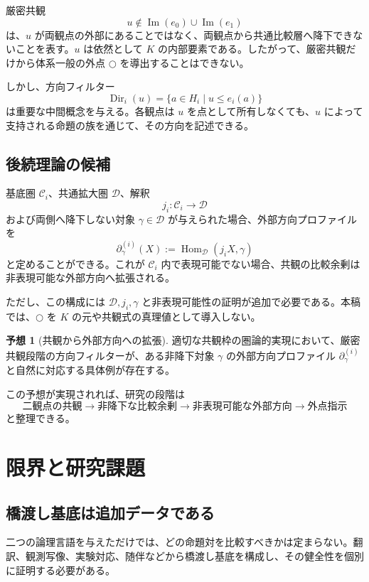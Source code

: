 \documentclass[a4paper,11pt]{ltjsarticle}
\theoremstyle{definition}
\newtheorem{conjecture}[definition]{予想}
\theoremstyle{plain}
\newcommand{\Img}{\operatorname{Im}}
\newcommand{\Dir}{\operatorname{Dir}}
\newcommand{\Hom}{\operatorname{Hom}}
\newcommand{\dfix}{\bigcirc}
\begin{document}
厳密共観
\[
 u\notin\Img(e_0)\cup\Img(e_1)
\]
は、$u$ が両観点の外部にあることではなく、両観点から共通比較層へ降下できないことを表す。$u$ は依然として $K$ の内部要素である。したがって、厳密共観だけから体系一般の外点 $\dfix$ を導出することはできない。

しかし、方向フィルター
\[
 \Dir_i(u)=\{a\in H_i\mid u\leq e_i(a)\}
\]
は重要な中間概念を与える。各観点は $u$ を点として所有しなくても、$u$ によって支持される命題の族を通じて、その方向を記述できる。

\subsection{後続理論の候補}

基底圏 $\mathcal C_i$、共通拡大圏 $\mathcal D$、解釈
\[
 j_i:\mathcal C_i\longrightarrow\mathcal D
\]
および両側へ降下しない対象 $\gamma\in\mathcal D$ が与えられた場合、外部方向プロファイルを
\[
 \partial_\gamma^{(i)}(X)
 :=\Hom_{\mathcal D}(j_iX,\gamma)
\]
と定めることができる。これが $\mathcal C_i$ 内で表現可能でない場合、共観の比較余剰は非表現可能な外部方向へ拡張される。

ただし、この構成には $\mathcal D,j_i,\gamma$ と非表現可能性の証明が追加で必要である。本稿では、$\dfix$ を $K$ の元や共観式の真理値として導入しない。

\begin{conjecture}[共観から外部方向への拡張]
適切な共観枠の圏論的実現において、厳密共観段階の方向フィルターが、ある非降下対象 $\gamma$ の外部方向プロファイル $\partial_\gamma^{(i)}$ と自然に対応する具体例が存在する。
\end{conjecture}

この予想が実現されれば、研究の段階は
\[
 \text{二観点の共観}
 \longrightarrow
 \text{非降下な比較余剰}
 \longrightarrow
 \text{非表現可能な外部方向}
 \longrightarrow
 \text{外点指示}
\]
と整理できる。

\section{限界と研究課題}

\subsection{橋渡し基底は追加データである}

二つの論理言語を与えただけでは、どの命題対を比較すべきかは定まらない。翻訳、観測写像、実験対応、随伴などから橋渡し基底を構成し、その健全性を個別に証明する必要がある。
\end{document}

